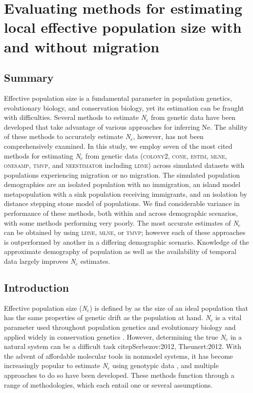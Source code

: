 \chapter{Evaluating methods for estimating local effective population size with and without migration}
\label{chap:effectivepopsize}

\section{Summary}

Effective population size is a fundamental parameter in population genetics, evolutionary 
biology, and conservation biology, yet its estimation can be fraught with difficulties. 
Several methods to estimate \emph{N}$_e$ from genetic data have been developed that take 
advantage of various approaches for inferring Ne. The ability of these methods to accurately 
estimate \emph{N}$_e$, however, has not been comprehensively examined. In this study, we 
employ seven of the most cited methods for estimating \emph{N}$_e$ from genetic data 
(\textsc{colony2}, \textsc{cone}, \textsc{estim}, \textsc{mlne}, \textsc{onesamp}, \textsc{tmvp}, 
and \textsc{neestimator} including \textsc{ldne}) across simulated datasets with populations 
experiencing migration or no migration. The simulated population demographies are an isolated 
population with no immigration, an island model metapopulation with a sink population receiving 
immigrants, and an isolation by distance stepping stone model of populations. We find considerable 
variance in performance of these methods, both within and across demographic scenarios, with 
some methods performing very poorly. The most accurate estimates of \emph{N}$_e$ can be 
obtained by using \textsc{ldne}, \textsc{mlne}, or \textsc{tmvp}; however each of these 
approaches is outperformed by another in a differing demographic scenario. Knowledge of the 
approximate demography of population as well as the availability of temporal data largely 
improves \emph{N}$_e$ estimates.

\section{Introduction}
Effective population size (\emph{N}$_e$) is defined by \citet{Wright:1931} as the size of 
an ideal population that has the same properties of genetic drift as the population at hand. 
\emph{N}$_e$ is a vital parameter used throughout population genetics and evolutionary 
biology and applied widely in conservation genetics \citep{Schwartz:2007, Dudgeon:2012}. 
However, determining the true \emph{N}$_e$ in a natural system can be a difficult task 
citep{Serbezov:2012, Theunert:2012}. With the advent of affordable molecular tools 
in nonmodel systems, it has become increasingly popular to estimate \emph{N}$_e$ using genotypic 
data \citep{Wang:2005, Palstra:2012}, and multiple approaches to do so have been developed. 
These methods function through a range of methodologies, which each entail one or several assumptions.

